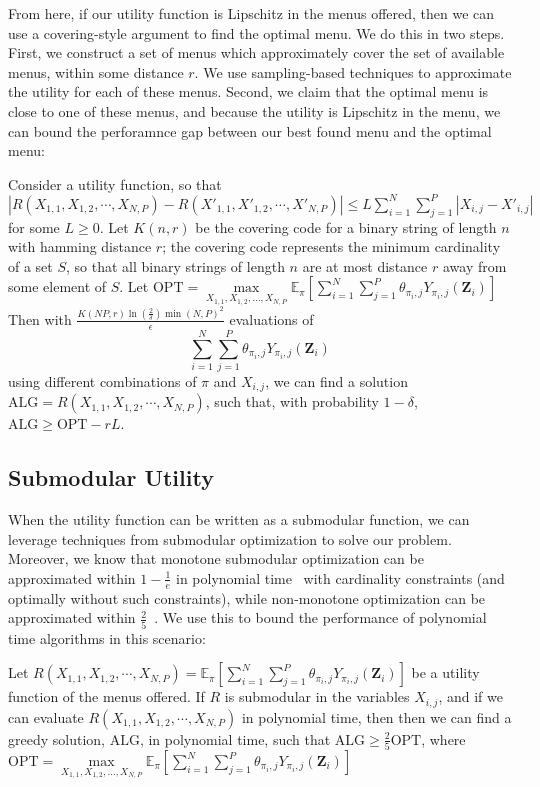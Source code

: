 From here, if our utility function is Lipschitz in the menus offered, then we can use a covering-style argument to find the optimal menu. 
We do this in two steps. 
First, we construct a set of menus which approximately cover the set of available menus, within some distance $r$. 
We use sampling-based techniques to approximate the utility for each of these menus. 
Second, we claim that the optimal menu is close to one of these menus, and because the utility is Lipschitz in the menu, we can bound the perforamnce gap between our best found menu and the optimal menu: 
\begin{theorem}
    Consider a utility function, so that $|R(X_{1,1},X_{1,2},\cdots,X_{N,P}) - R(X'_{1,1},X'_{1,2},\cdots,X'_{N,P})| \leq L \sum_{i=1}^{N} \sum_{j=1}^{P} |X_{i,j}-X'_{i,j}|$ for some $L \geq 0$. 
    Let $K(n,r)$ be the covering code for a binary string of length $n$ with hamming distance $r$; the covering code represents the minimum cardinality of a set $S$, so that all binary strings of length $n$ are at most distance $r$ away from some element of $S$. 
    Let $\mathrm{OPT} = \max\limits_{X_{1,1},X_{1,2},\ldots,X_{N,P}} \mathbb{E}_{\pi}[\sum_{i=1}^{N} \sum_{j=1}^{P} \theta_{\pi_{i},j} Y_{\pi_{i},j}(\mathbf{Z}_{i})]$
    Then with $\frac{K(NP,r) \ln(\frac{2}{\delta}) \min{(N,P)}^{2}}{\epsilon}$ evaluations of 
    \begin{equation}
        \sum_{i=1}^{N} \sum_{j=1}^{P} \theta_{\pi_{i},j} Y_{\pi_{i},j}(\mathbf{Z}_{i})
    \end{equation}
    using different combinations of $\pi$ and $X_{i,j}$, we can find a solution $\mathrm{ALG} = R(X_{1,1},X_{1,2},\cdots,X_{N,P})$, such that, with probability $1-\delta$, $\mathrm{ALG} \geq \mathrm{OPT} - rL$. 
\end{theorem}

\subsection{Submodular Utility}
When the utility function can be written as a submodular function, we can leverage techniques from submodular optimization to solve our problem. 
Moreover, we know that monotone submodular optimization can be approximated within $1-\frac{1}{e}$ in polynomial time~\cite{submodular_optimization} with cardinality constraints (and optimally without such constraints), while non-monotone optimization can be approximated within $\frac{2}{5}$~\cite{non_monotone_submodular}. 
We use this to bound the performance of polynomial time algorithms in this scenario: 
\begin{lemma}
    Let $R(X_{1,1},X_{1,2},\cdots,X_{N,P}) = \mathbb{E}_{\pi}[\sum_{i=1}^{N} \sum_{j=1}^{P} \theta_{\pi_{i},j} Y_{\pi_{i},j}(\mathbf{Z}_{i})]$ be a utility function of the menus offered.
    If $R$ is submodular in the variables $X_{i,j}$, and if we can evaluate $R(X_{1,1},X_{1,2},\cdots,X_{N,P})$ in polynomial time, then then we can find a greedy solution, $\mathrm{ALG}$, in polynomial time, such that $\mathrm{ALG} \geq \frac{2}{5} \mathrm{OPT}$, where $\mathrm{OPT} = \max\limits_{X_{1,1},X_{1,2},\ldots,X_{N,P}} \mathbb{E}_{\pi}[\sum_{i=1}^{N} \sum_{j=1}^{P} \theta_{\pi_{i},j} Y_{\pi_{i},j}(\mathbf{Z}_{i})]$
\end{lemma}

